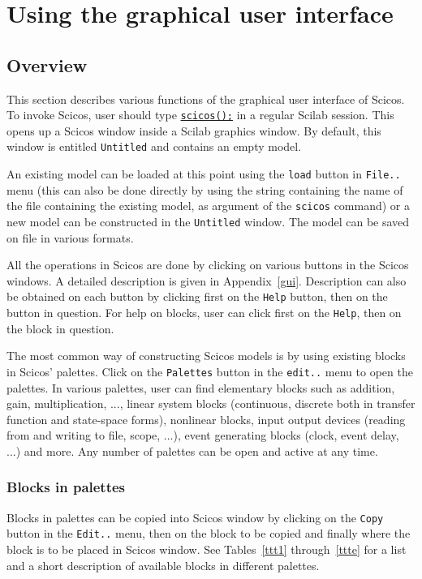 \documentclass{book}
\begin{document}
\appendix

\chapter{Using the graphical user interface}
\label{tta}
\section{Overview}
This section describes various functions of the graphical user
interface of Scicos. To invoke Scicos, user should type
\underline{{\tt scicos();}} 
in a regular Scilab session. This opens up a 
Scicos   window inside a Scilab graphics window. By default, this window is
entitled {\tt Untitled} and contains an empty model.

An existing model can be loaded at this point using the {\tt load}
button in {\tt File..} menu (this can also be done directly by
using the string containing the name of the file containing the
existing model, as argument of the {\tt scicos} command) or a new model can
be constructed in the {\tt Untitled} window. The model can be saved on
file in various formats. 

All the operations in Scicos  are done by
clicking on various buttons in the Scicos  windows. A detailed
description is given in Appendix~\ref{gui}. Description can also be obtained
on each button by clicking first on the {\tt Help}
button, then on the button in question. For help on blocks, user can click
first on the {\tt Help}, then on the block in question. 

The most common way of constructing Scicos   models is by using existing
blocks in Scicos' palettes. Click on the {\tt Palettes} button in the
{\tt edit..} menu to open
the palettes. In various palettes, user can find elementary blocks such as
addition, gain, multiplication, ..., linear system blocks (continuous,
discrete both in transfer function and state-space forms), nonlinear
blocks, input output devices (reading from and writing to file, scope,
...), event generating blocks (clock, event delay, ...) and more. Any
number of palettes can be open and active at any time.


\subsection{Blocks in palettes}
\label{pal}
Blocks in palettes can be copied into Scicos  window by clicking on the
{\tt Copy} button in the {\tt Edit..} menu, then on the block to be copied
and finally where the 
block is to be placed in Scicos window. See Tables~\ref{ttt1} 
through~\ref{ttte} for a list and a short description of available
blocks in different palettes.
\end{document}
